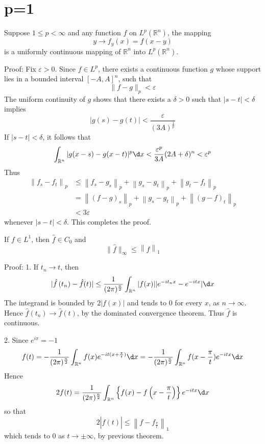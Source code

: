 \documentclass[12pt, a4paper, oneside]{book}
\begin{document}
\section{p=1}
\begin{theorem}
    Suppose $1 \leq p < \infty$ and any function $f$ on $L^p (\mathbb{R}^n)$, the mapping
    $$
        y \rightarrow f_y (x)=f(x-y)
    $$
    is a uniformly continuous mapping of $\mathbb{R}^n$ into $L^p (\mathbb{R}^n)$.

    Proof:
    Fix $\varepsilon>0$. Since $f \in L^p$, there exists a continuous function $g$ whose support lies in a bounded interval $[-A, A]^n$, such that
    $$
        \|f-g\|_p<\varepsilon
    $$
    The uniform continuity of $g$ shows that there exists a $\delta >0$ such that $|s-t|<\delta$ implies
    $$
        |g(s)-g(t)|<\frac{\varepsilon}{(3 A)^{\frac{1}{p}}}
    $$
    If $|s-t|<\delta$, it follows that
    $$
        \int_{\mathbb{R}^n} |g(x-s)-g(x-t)|^p \d  x
        <
        \frac{\varepsilon^p}{3A} (2 A+\delta)^n
        <
        \varepsilon^p
    $$
    Thus
    $$
        \begin{aligned}
            \left\|f_s-f_t\right\|_p & \leq\left\|f_s-g_s\right\|_p+\left\|g_s-g_t\right\|_p+\left\|g_t-f_t\right\|_p \\
                                     & =\left\|(f-g)_s\right\|_p+\left\|g_s-g_t\right\|_p+\left\|(g-f)_t\right\|_p    \\
                                     & < 3 \varepsilon
        \end{aligned}
    $$
    whenever $|s-t|<\delta$. This completes the proof.
\end{theorem}
\begin{theorem}
    If $f\in L^1$, then $\hat{f} \in C_0$ and
    $$
        \|\hat{f}\|_{\infty} \leq\left\| f \right\|_1
    $$

    Proof:
    1. If $t_n \rightarrow t$, then
    $$
        |\hat{f}\left(t_n\right)-\hat{f}(t)|
        \leq
        \frac{1}{(2\pi)^{\frac{n}{2}}} \int_{\mathbb{R}^n} |f(x)||e^{-i t_n x}-e^{-i t x}| \d  x
    $$
    The integrand is bounded by $2|f(x)|$ and tends to 0 for every $x$, as $n \rightarrow \infty$. Hence $\hat{f}\left(t_n\right) \rightarrow \hat{f}(t)$, by the dominated convergence theorem. Thus $\hat{f}$ is continuous.

    2. Since $e^{i\pi}=-1$
    $$
        f(t)= - \frac{1}{(2\pi)^{\frac{n}{2}}} \int_{\mathbb{R}^n} f(x) e^{-i t(x+\frac{\pi}{t})} \d  x
        =-\frac{1}{(2\pi)^{\frac{n}{2}}} \int_{\mathbb{R}^n}
        f(x-\frac{\pi}{t}) e^{-i t x} \d  x
    $$
    Hence
    $$
        2 f(t)= \frac{1}{(2\pi)^{\frac{n}{2}}} \int_{\mathbb{R}^n}\left\{f(x)-f\left(x-\frac{\pi}{t}\right)\right\} e^{-i t x} \d  x
    $$
    so that
    $$
        2|\hat{f}(t)| \leq\left\|f-f_{\frac{\pi}{t}}\right\|_1
    $$
    which tends to 0 as $t \rightarrow \pm \infty$, by previous theorem.
\end{theorem}
\end{document}
